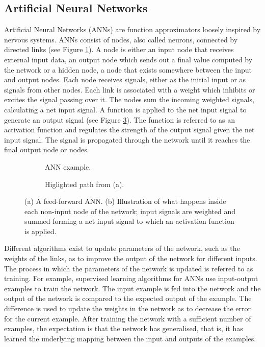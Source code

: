 \newpage
\subsection{Artificial Neural Networks}
Artificial Neural Networks (ANNs) are function approximators loosely inspired by nervous systems.
ANNs consist of nodes, also called neurons, connected by directed links (see Figure \ref{feedforward}). 
A node is either an input node that receives external input data, an output node which sends out a final value computed
by the network or a hidden node, a node that exists somewhere between the input and output nodes. Each node receives signals, either
as the initial input or as signals from other nodes. Each link is associated with a weight which inhibits or excites the signal 
passing over it. The nodes sum the incoming weighted signals, calculating a net input signal. A function is applied to the net input 
signal to generate an output signal (see Figure \ref{neuron}). The function is referred to as an activation function and regulates the strength of the output 
signal given the net input signal. The signal is propagated through the network until it reaches the final output node or nodes.


\begin{figure}[htb]
    \begin{mdframed}
        \begin{subfigure}[b]{0.5\textwidth}
            \centering
            \resizebox{0.7\textwidth}{!}{}
            \caption{ANN example.}
            \label{feedforward}
        \end{subfigure}
        \begin{subfigure}[b]{0.5\textwidth}
            \centering
            \resizebox{0.9\textwidth}{!}{}
            \caption{Higlighted path from (a).}
            \label{neuron}
        \end{subfigure}
    \end{mdframed}
    \caption{(a) A feed-forward ANN. (b) Illustration of what happens inside each non-input node of the network; input
                 signals are weighted and summed forming a net input signal to which an activation function is applied.}
\end{figure}

Different algorithms exist to update parameters of the network, such as the weights of the
links, as to improve the output of the network for different inputs. The process in which the parameters of 
the network is updated is referred to as training. For example, supervised learning algorithms for ANNs use input-output 
examples to train the network. The input example is fed into the network and the output of the network is compared 
to the expected output of the example. The difference is used to update the weights in the network as to decrease
the error for the current example. After training the network with a sufficient number of examples, the expectation is 
that the network has generalised, that is, it has learned the underlying mapping between the input and outputs of the examples.



